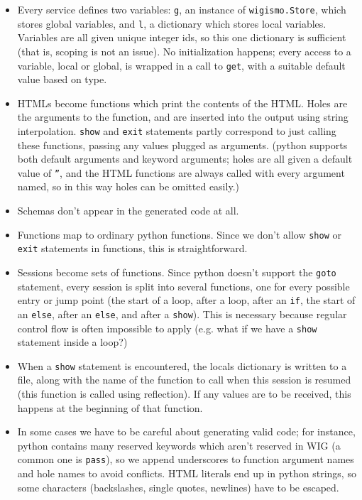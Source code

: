 \documentclass{WigReport}
\begin{document}
\begin{itemize}
\item Every service defines two variables: {\tt g}, an instance of
{\tt wigismo.Store}, which stores global variables, and {\tt l}, a
dictionary which stores local variables. Variables are all given unique
integer ids, so this one dictionary is sufficient (that is, scoping is not
an issue). No initialization happens; every access to a variable, local
or global, is wrapped in a call to {\tt get}, with a suitable default
value based on type.
\item HTMLs become functions which print the contents of the HTML. Holes
are the arguments to the function, and are inserted into the output using
string interpolation. {\tt show} and {\tt exit} statements partly 
correspond to just calling these functions, passing any values plugged as 
arguments. (python supports both default arguments and keyword arguments;
holes are all given a default value of {\tt ''}, and the HTML functions
are always called with every argument named, so in this way holes can be
omitted easily.)
\item Schemas don't appear in the generated code at all.
\item Functions map to ordinary python functions. Since we don't allow
{\tt show} or {\tt exit} statements in functions, this is straightforward.
\item Sessions become sets of functions. Since python doesn't support the
{\tt goto} statement, every session is split into several functions, one
for every possible entry or jump point (the start of a loop, after a loop,
after an {\tt if}, the start of an {\tt else}, after an {\tt else}, and
after a {\tt show}). This is necessary because regular control flow is
often impossible to apply (e.g. what if we have a {\tt show} statement
inside a loop?)
\item When a {\tt show} statement is encountered, the locals dictionary
is written to a file, along with the name of the function to call when
this session is resumed (this function is called using reflection). If
any values are to be received, this happens at the beginning of that
function.
\item In some cases we have to be careful about generating valid code;
for instance, python contains many reserved keywords which aren't reserved
in WIG (a common one is {\tt pass}), so we append underscores to function
argument names and hole names to avoid conflicts. HTML literals end up in
python strings, so some characters (backslashes, single quotes, newlines)
have to be escaped.
\end{itemize}
\end{document}
